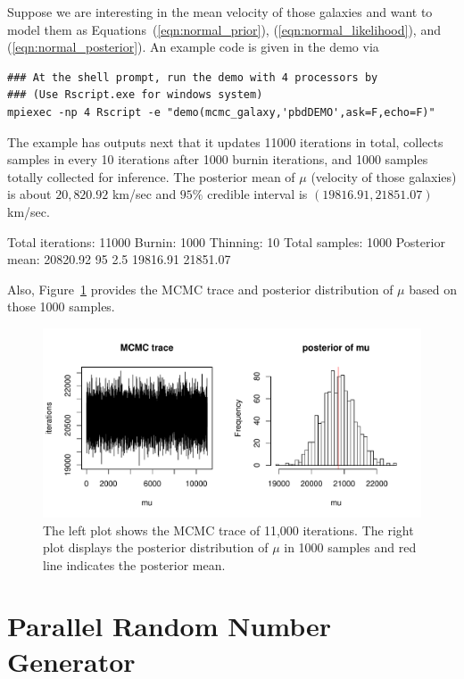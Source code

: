 Suppose we are interesting in the mean velocity of those galaxies and want to
model them as Equations~(\ref{eqn:normal_prior}), (\ref{eqn:normal_likelihood}),
and (\ref{eqn:normal_posterior}).
An example code is given in the  demo via
\begin{lstlisting}
### At the shell prompt, run the demo with 4 processors by
### (Use Rscript.exe for windows system)
mpiexec -np 4 Rscript -e "demo(mcmc_galaxy,'pbdDEMO',ask=F,echo=F)"
\end{lstlisting}
The example has outputs next that it updates 11000 iterations
in total, collects samples in every 10 iterations after 1000 burnin iterations,
and 1000 samples totally collected for inference. The posterior mean of
$\mu$ (velocity of those galaxies) is about $20,820.92$ km/sec and
$95\%$ credible interval is $(19816.91, 21851.07)$ km/sec.
\begin{CodeOutput}
Total iterations: 11000
Burnin: 1000
Thinning: 10
Total samples: 1000
Posterior mean: 20820.92
95%
    2.5%
19816.91 21851.07 
\end{CodeOutput}
Also, Figure~\ref{fig:mcmc_galaxy} provides the MCMC trace and
posterior distribution of $\mu$ based on those 1000 samples.
\begin{figure}[ht]
\centering
  \includegraphics[width=6.0in]{pbdDEMO-include/pics/galaxy_mcmc}
\caption[MCMC results of velocities of 82 galaxies]{
The left plot shows the MCMC trace of 11,000 iterations.
The right plot displays the posterior distribution of $\mu$ in 1000 samples
and red line indicates the posterior mean.}
\label{fig:mcmc_galaxy}
\end{figure}


\section{Parallel Random Number Generator}
\label{sec:prng}

